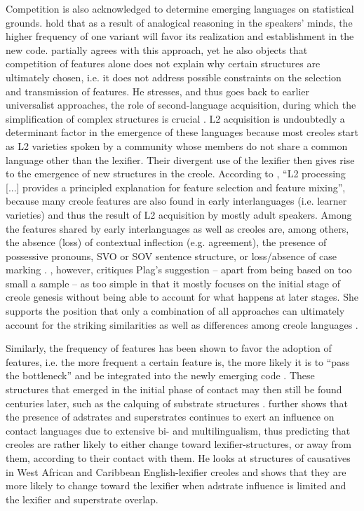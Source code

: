 \documentclass[output=paper]{langscibook}
\begin{document}
Competition is also acknowledged to determine emerging languages on statistical grounds. \citet{batesetal1987competition} hold that as a result of analogical reasoning in the speakers’ minds, the higher frequency of one variant will favor its realization and establishment in the new code. \citet{plag2011creolization} partially agrees with this approach, yet he also objects that competition of features alone does not explain why certain structures are ultimately chosen, i.e. it does not address possible constraints on the selection and transmission of features. He stresses, and thus goes back to earlier universalist approaches, the role of second-language acquisition, during which the simplification of complex structures is crucial \citep[cf. also][]{trudgill2011sociolinguistic}. L2 acquisition is undoubtedly a determinant factor in the emergence of these languages because most creoles start as L2 varieties spoken by a community whose members do not share a common language other than the lexifier. Their divergent use of the lexifier then gives rise to the emergence of new structures in the creole. According to \citet[102]{plag2011creolization}, “L2 processing [...] provides a principled explanation for feature selection and feature mixing”, because many creole features are also found in early interlanguages (i.e. learner varieties) and thus the result of L2 acquisition by mostly adult speakers. Among the features shared by early interlanguages as well as creoles are, among others, the absence (loss) of contextual inflection (e.g. agreement), the presence of possessive pronouns, SVO or SOV sentence structure, or loss/absence of case marking \citep[93]{plag2011creolization}. \citet{baptista2016creole}, however, critiques Plag’s suggestion – apart from being based on too small a sample – as too simple in that it mostly focuses on the initial stage of creole genesis without being able to account for what happens at later stages. She supports the position that only a combination of all approaches can ultimately account for the striking similarities as well as differences among creole languages \citep[140]{baptista2017competition}.

Similarly, the frequency of features has been shown to favor the adoption of features, i.e. the more frequent a certain feature is, the more likely it is to “pass the bottleneck” and be integrated into the newly emerging code \citep{good2013typologizing}. These structures that emerged in the initial phase of contact may then still be found centuries later, such as the calquing of substrate structures \citep[e.g.][]{heineetal2005language}. \citet{yakpo2017towards} further shows that the presence of adstrates and superstrates continues to exert an influence on contact languages due to extensive bi- and multilingualism, thus predicting that creoles are rather likely to either change toward lexifier-structures, or away from them, according to their contact with them. He looks at structures of causatives in West African and Caribbean English-lexifier creoles and shows that they are more likely to change toward the lexifier when adstrate influence is limited and the lexifier and superstrate overlap. 
\end{document}

